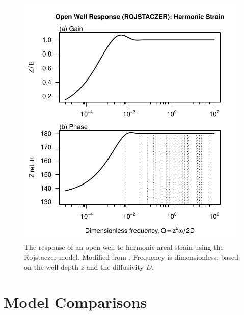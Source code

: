 \documentclass[12pt]{article}\usepackage[]{graphicx}\usepackage[]{color}
\makeatletter
\def\maxwidth{ %
  \ifdim\Gin@nat@width>\linewidth
    \linewidth
  \else
    \Gin@nat@width
  \fi
}
\newenvironment{knitrout}{}{} %
\makeatother
\begin{document}
\begin{figure}[htb!]
\begin{center}
\begin{knitrout}\small
{}\color{fgcolor}
\includegraphics[width=\maxwidth]{figure/ROJRESPFIG-1} 

\end{knitrout}
\caption{The response of an open well to harmonic areal strain using
the Rojstaczer model. Modified from \citet[][Fig.~3]{rojstaczer1988}.
Frequency is dimensionless, based on the well-depth $z$ and the diffusivity
$D$.}
\label{fig:owrsp-roj}
\end{center}
\end{figure}


\clearpage
\section{Model Comparisons}
\end{document}
